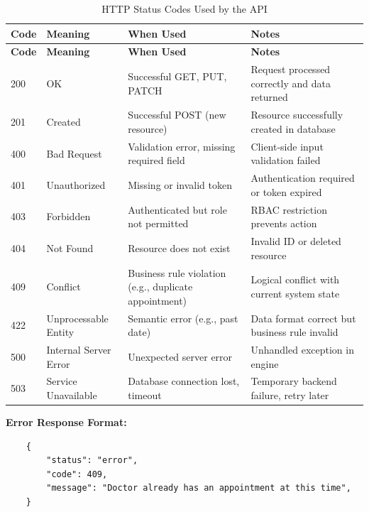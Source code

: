 \begin{longtable}{%
		p{}
		p{}
		p{}
		p{}}
	
	\caption{HTTP Status Codes Used by the API}
	\label{tab:http-status-codes} \\
	
	\toprule
	\textbf{Code} & \textbf{Meaning} & \textbf{When Used} & \textbf{Notes} \\
	\midrule
	\endfirsthead
	
	\toprule
	\textbf{Code} & \textbf{Meaning} & \textbf{When Used} & \textbf{Notes} \\
	\midrule
	\endhead
	
	200 & OK & Successful GET, PUT, PATCH & Request processed correctly and data returned \\[8pt]
	201 & Created & Successful POST (new resource) & Resource successfully created in database \\[8pt]
	400 & Bad Request & Validation error, missing required field & Client-side input validation failed \\[8pt]
	401 & Unauthorized & Missing or invalid token & Authentication required or token expired \\[8pt]
	403 & Forbidden & Authenticated but role not permitted & RBAC restriction prevents action \\[8pt]
	404 & Not Found & Resource does not exist & Invalid ID or deleted resource \\[8pt]
	409 & Conflict & Business rule violation (e.g., duplicate appointment) & Logical conflict with current system state \\[8pt]
	422 & Unprocessable Entity & Semantic error (e.g., past date) & Data format correct but business rule invalid \\[8pt]
	500 & Internal Server Error & Unexpected server error & Unhandled exception in engine \\[8pt]
	503 & Service Unavailable & Database connection lost, timeout & Temporary backend failure, retry later \\
	
	\bottomrule
\end{longtable}

\medskip
\textbf{Error Response Format:}
\begin{verbatim}
	{
		"status": "error",
		"code": 409,
		"message": "Doctor already has an appointment at this time",
	}
\end{verbatim}

